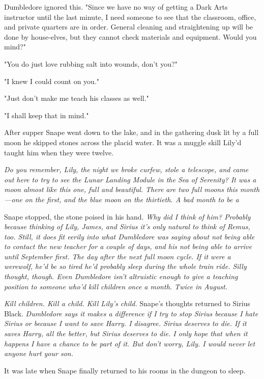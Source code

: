 Dumbledore ignored this. "Since we have no way of getting a Dark Arts instructor until the last minute, I need someone to see that the classroom, office, and private quarters are in order. General cleaning and straightening up will be done by house-elves, but they cannot check materials and equipment. Would you mind?"

"You do just love rubbing salt into wounds, don't you?"

"I knew I could count on you."

"Just don't make me teach his classes as well."

"I shall keep that in mind."

After supper Snape went down to the lake, and in the gathering dusk lit by a full moon he skipped stones across the placid water. It was a muggle skill Lily'd taught him when they were twelve.

\emph{Do you remember, Lily, the night we broke curfew, stole a telescope, and came out here to try to see the Lunar Landing Module in the Sea of Serenity? It was a moon almost like this one, full and beautiful. There are two full moons this month—one on the first, and the blue moon on the thirtieth. A bad month to be a{\el}}

Snape stopped, the stone poised in his hand. \emph{Why did I think of him? Probably because thinking of Lily, James, and Sirius it's only natural to think of Remus, too. Still, it does fit eerily into what Dumbledore was saying about not being able to contact the new teacher for a couple of days, and his not being able to arrive until September first. The day after the next full moon cycle. If it were a werewolf, he'd be so tired he'd probably sleep during the whole train ride. Silly thought, though. Even Dumbledore isn't altruistic enough to give a teaching position to someone who'd kill children once a month. Twice in August.}

\emph{Kill children. Kill a child. Kill Lily's child.} Snape's thoughts returned to Sirius Black. \emph{Dumbledore says it makes a difference if I try to stop Sirius because I hate Sirius or because I want to save Harry. I disagree. Sirius deserves to die. If it saves Harry, all the better, but Sirius deserves to die. I only hope that when it happens I have a chance to be part of it. But don't worry, Lily. I would never let anyone hurt your son.}

It was late when Snape finally returned to his rooms in the dungeon to sleep.

\sbreak

